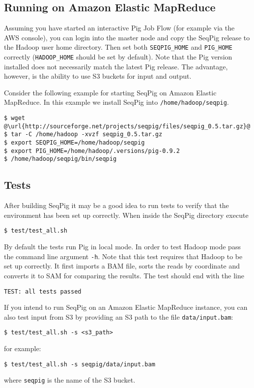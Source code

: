 \subsection{Running on Amazon Elastic MapReduce}

Assuming you have started an interactive Pig Job Flow (for example via
the AWS console), you can login into the master node and copy the SeqPig release to the Hadoop
user home directory. Then set both {\tt SEQPIG\_HOME} and {\tt PIG\_HOME}
correctly ({\tt HADOOP\_HOME} should be set by default). Note that the
Pig version installed does not necessarily match the latest Pig release.
The advantage, however, is the ability to use S3 buckets for input and
output.

Consider the following example for starting SeqPig on Amazon Elastic MapReduce. In this
example we install SeqPig into {\tt /home/hadoop/seqpig}.
\begin{lstlisting} 
$ wget @\url{http://sourceforge.net/projects/seqpig/files/seqpig_0.5.tar.gz}@
$ tar -C /home/hadoop -xvzf seqpig_0.5.tar.gz
$ export SEQPIG_HOME=/home/hadoop/seqpig
$ export PIG_HOME=/home/hadoop/.versions/pig-0.9.2
$ /home/hadoop/seqpig/bin/seqpig
\end{lstlisting}

\subsection{Tests}

After building SeqPig it may be a good idea to run tests to verify that
the environment has been set up correctly. When inside the SeqPig directory
execute
\begin{lstlisting} 
$ test/test_all.sh
\end{lstlisting}
By default the tests run Pig in local mode. In order to test Hadoop
mode pass the command line argument {\tt -h}. Note that this test
requires that Hadoop to be set up correctly. It first imports a BAM
file, sorts the reads by coordinate and converts it to SAM for
comparing the results. The test should end with the line
\begin{lstlisting}
TEST: all tests passed
\end{lstlisting}
If you intend to run SeqPig on an Amazon Elastic MapReduce instance, you can
also test input from S3 by providing an S3 path to the file {\tt data/input.bam}:
\begin{lstlisting} 
$ test/test_all.sh -s <s3_path>
\end{lstlisting}
for example:
\begin{lstlisting} 
$ test/test_all.sh -s seqpig/data/input.bam
\end{lstlisting}
where {\tt seqpig} is the name of the S3 bucket.

